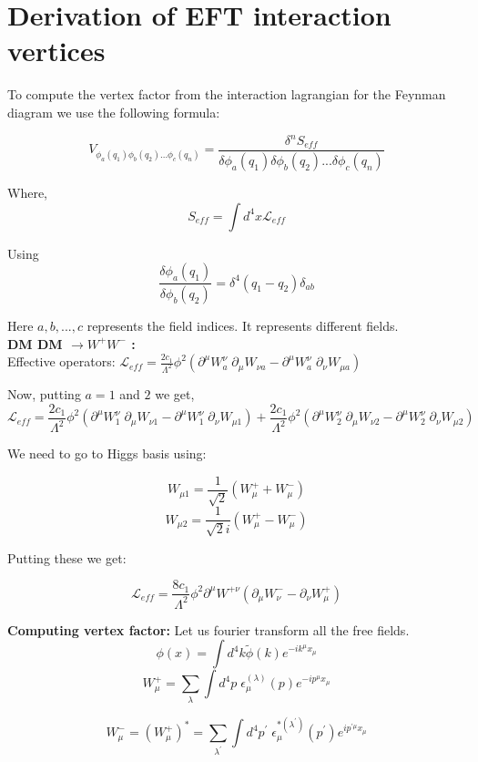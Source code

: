 \documentclass[12pt]{report}
\begin{document}
\section{Derivation of EFT interaction vertices}




To compute the vertex factor from the interaction lagrangian for the Feynman diagram we use the following formula:

\begin{equation}
V_{\phi_a(q_1) \phi_b(q_2)...\phi_c(q_n)} = \frac{\delta^nS_{eff}}{\delta \phi_a(q_1) \delta\phi_b(q_2)... \delta \phi_c(q_n)}
\end{equation} 

Where, $$S_{eff} = \int d^4x \mathscr{L}_{eff}$$

Using $$\frac{\delta \phi_a(q_1)}{\delta \phi_b(q_2)} =\delta^4 (q_1-q_2) \delta_{ab} $$

Here $a,b,...,c$ represents the field indices. It represents different fields.\\



\textbf{DM DM $\longrightarrow W^+W^-$ :}\\

Effective operators: $\mathscr{L}_{eff}= \frac{2c_1}{\Lambda^2} \phi^2 (\partial^\mu W^\nu_a\; \partial_\mu W_{\nu a}- \partial^\mu W^\nu_a\; \partial_\nu W_{\mu a})$

Now, putting $a = 1$ and $2$ we get,
$$\mathscr{L}_{eff}= \frac{2c_1}{\Lambda^2} \phi^2 (\partial^\mu W^\nu_1\; \partial_\mu W_{\nu 1}- \partial^\mu W^\nu_1\; \partial_\nu W_{\mu 1}) + \frac{2c_1}{\Lambda^2} \phi^2 (\partial^\mu W^\nu_2\; \partial_\mu W_{\nu 2}- \partial^\mu W^\nu_2\; \partial_\nu W_{\mu 2})$$

We need to go to Higgs basis using:

$$W_{\mu 1}=\frac{1}{\sqrt{2}} (W_\mu^++W_\mu^-)$$
$$W_{\mu 2}=\frac{1}{\sqrt{2} i} (W_\mu^+-W_\mu^-)$$

Putting these we get:

$$\mathscr{L}_{eff}= \frac{8c_1}{\Lambda^2} \phi^2 \partial^\mu W^{+\nu}(\partial_\mu W_\nu^- - \partial_\nu W_\mu^+) $$

\textbf{Computing vertex factor:}
 Let us fourier transform all the free fields.
$$\phi(x)= \int d^4k \tilde{\phi}(k) e^{-ik^\mu x_\mu}$$
$$W^+_\mu = \sum_\lambda \int d^4p\; \epsilon_\mu^{(\lambda)}(p) e^{-ip^\mu x_\mu} $$

$$W^-_\mu= (W^+_\mu)^* = \sum_{\lambda^\prime} \int d^4p^\prime \; \epsilon_\mu^{*(\lambda^\prime)}(p^\prime) e^{ip^{\prime \mu} x_\mu} $$
\end{document}
